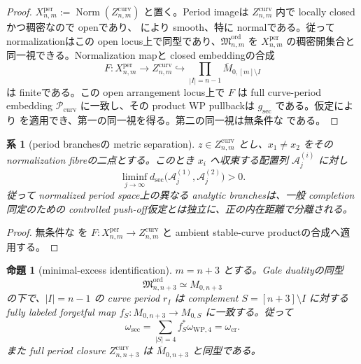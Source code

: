 \documentclass[11pt,a4paper]{ltjsarticle}
\newcommand{\Norm}{\operatorname{Norm}}
\newcommand{\ov}{\overline}
\newcommand{\cA}{\mathcal A}
\newcommand{\cP}{\mathcal P}
\newcommand{\Mord}{\mathfrak M^{\mathrm{ord}}}
\theoremstyle{plain}
\newtheorem{proposition}[proposition]{命題}
\newtheorem{corollary}[corollary]{系}
\theoremstyle{definition}
\theoremstyle{remark}
\begin{document}
\begin{proof}
$X_{n,m}^{\mathrm{per}}:=\Norm(Z_{n,m}^{\mathrm{curv}})$ と置く。Period imageは $Z_{n,m}^{\mathrm{curv}}$ 内で locally closedかつ稠密なので openであり、 により smooth、特に normalである。従って normalizationはこの open locus上で同型であり、$\Mord_{n,m}$ を $X_{n,m}^{\mathrm{per}}$ の稠密開集合と同一視できる。Normalization mapと closed embeddingの合成
\[
 F:X_{n,m}^{\mathrm{per}}
 \longrightarrow Z_{n,m}^{\mathrm{curv}}
 \hookrightarrow
 \prod_{|I|=n-1}\ov M_{0,[m]\setminus I}
\]
は finiteである。この open arrangement locus上で $F$ は full curve-period embedding $\cP_{\mathrm{curv}}$ に一致し、その product WP pullbackは $g_{\mathrm{sec}}$ である。仮定により  を適用でき、第一の同一視を得る。第二の同一視は無条件な  である。
\end{proof}

\begin{corollary}[period branchesの metric separation]
\label{cor:period-branch-separation}
$z\in Z_{n,m}^{\mathrm{curv}}$ とし、$x_1\ne x_2$ をその normalization fibreの二点とする。このとき $x_i$ へ収束する配置列 $\cA_j^{(i)}$ に対し
\[
 \liminf_{j\to\infty}
 d_{\mathrm{sec}}\bigl(\cA_j^{(1)},\cA_j^{(2)}\bigr)>0.
\]
従って normalized period space上の異なる analytic branchesは、一般 completion同定のための controlled push-off仮定とは独立に、正の内在距離で分離される。
\end{corollary}

\begin{proof}
無条件な  を
$F:X_{n,m}^{\mathrm{per}}\to Z_{n,m}^{\mathrm{curv}}$ と ambient stable-curve productの合成へ適用する。
\end{proof}

\begin{proposition}[minimal-excess identification]
\label{prop:minimal-excess}
$m=n+3$ とする。Gale dualityの同型
\[
 \Mord_{n,n+3}\simeq M_{0,n+3}
\]
の下で、$|I|=n-1$ の curve period $r_I$ は complement $S=[n+3]\setminus I$ に対する fully labeled forgetful map
$f_S:M_{0,n+3}\to M_{0,S}$ に一致する。従って
\[
 \omega_{\mathrm{sec}}=\sum_{|S|=4}f_S^*\omega_{\mathrm{WP},4}
 =\omega_{\mathrm{cr}}.
\]
また full period closure $Z_{n,n+3}^{\mathrm{curv}}$ は $\ov M_{0,n+3}$ と同型である。
\end{proposition}
\end{document}
